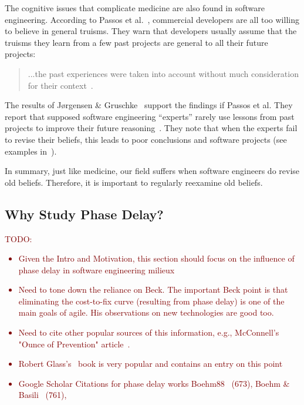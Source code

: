 \documentclass{sig-alternate}
\newcommand{\todo}[1]{\textcolor{Maroon}{TODO: #1}}
\begin{document}
The cognitive issues that complicate medicine are also found in software engineering.
According to Passos et al.~\cite{passos11}, commercial developers
are all too willing to believe in general
truisms.
They  warn that developers
usually assume that the truisms they learn from a few past
projects are general to 
all their future projects:
\begin{quote}\label{q:pass}
...the past experiences were taken into account without 
much consideration for their context~\cite{passos11}.  
\end{quote}
The results of J{\o}rgensen \& Gruschke~\cite{jorgensen09} support the findings if Passos et al. They report that 
  supposed software engineering    ``experts'' rarely use lessons
  from past projects to improve their future reasoning~\cite{jorgensen09}. 
 They note that
when the experts
  fail to revise their beliefs, this leads to poor
 conclusions and software projects  (see examples in~\cite{jorgensen09}).

In summary, just like medicine, our field suffers when
 software engineers do  revise old beliefs.  Therefore, it is important
 to regularly  reexamine    old beliefs.
 
\subsection{Why Study Phase Delay?}
\todo{\begin{itemize}
\item Given the Intro and Motivation, this section should focus on the influence of phase delay in software engineering milieux
\item Need to tone down the reliance on Beck. The important Beck point is that eliminating the cost-to-fix curve (resulting from phase delay) is one of the main goals of agile. His observations on new technologies are good too.
\item Need to cite other popular sources of this information, e.g., McConnell's "Ounce of Prevention" article~\cite{mcconnell01}.
\item Robert Glass's~\cite{glass02} book is very popular and contains an entry on this point
\item Google Scholar Citations for phase delay works Boehm88~\cite{boehm88} (673), Boehm \& Basili~\cite{boehm01} (761), 
\end{itemize}}
\end{document}
